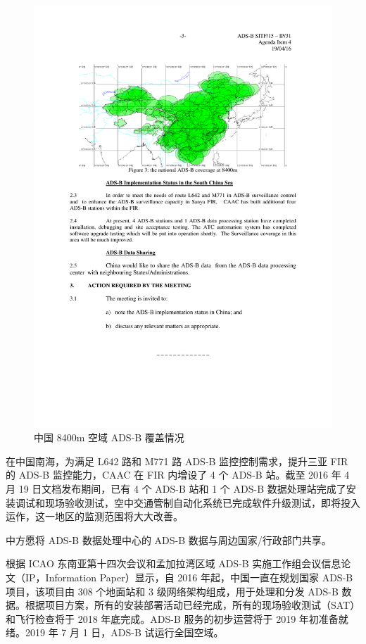 \begin{figure}[htbp]
\centering
\includegraphics[width=12cm]{pic/china_8400m.pdf}
\caption{中国 8400m 空域 ADS-B 覆盖情况\protect\footnotemark}
\label{fig:china_8400m}
\end{figure}


在中国南海，为满足 L642 路和 M771 路 ADS-B 监控控制需求，提升三亚 FIR 的 ADS-B 监控能力，CAAC 在 FIR 内增设了 4 个 ADS-B 站。截至 2016 年 4 月 19 日文档发布期间，已有 4 个 ADS-B 站和 1 个 ADS-B 数据处理站完成了安装调试和现场验收测试，空中交通管制自动化系统已完成软件升级测试，即将投入运作，这一地区的监测范围将大大改善。

中方愿将 ADS-B 数据处理中心的 ADS-B 数据与周边国家/行政部门共享。

根据 ICAO 东南亚第十四次会议和孟加拉湾区域 ADS-B 实施工作组会议信息论文（IP，Information Paper）显示，自 2016 年起，中国一直在规划国家 ADS-B 项目，该项目由 308 个地面站和 3 级网络架构组成，用于处理和分发 ADS-B 数据。根据项目方案，所有的安装部署活动已经完成，所有的现场验收测试（SAT）和飞行检查将于 2018 年底完成。ADS-B 服务的初步运营将于 2019 年初准备就绪。2019 年 7 月 1 日，ADS-B 试运行全国空域。

